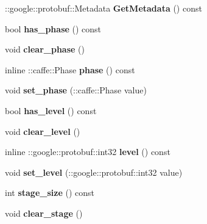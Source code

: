 \begin{DoxyCompactItemize}
\+::google\+::protobuf\+::\+Metadata {\bfseries Get\+Metadata} () const
\item 
\mbox{\label{classcaffe_1_1_net_state_aafd95100cc8ca5ce87c761667bbf393f}} 
bool {\bfseries has\+\_\+phase} () const
\item 
\mbox{\label{classcaffe_1_1_net_state_af50137493381c9651eaecf3464f3e2be}} 
void {\bfseries clear\+\_\+phase} ()
\item 
\mbox{\label{classcaffe_1_1_net_state_a53077555e0e42f88aca0f782a24d9005}} 
inline \+::caffe\+::\+Phase {\bfseries phase} () const
\item 
\mbox{\label{classcaffe_1_1_net_state_adf565a17b80511fcfe893353ce5e9343}} 
void {\bfseries set\+\_\+phase} (\+::caffe\+::\+Phase value)
\item 
\mbox{\label{classcaffe_1_1_net_state_abee34a40c3349b58f21950357f850e9c}} 
bool {\bfseries has\+\_\+level} () const
\item 
\mbox{\label{classcaffe_1_1_net_state_a24e7f1b57c871344c342653f1206e683}} 
void {\bfseries clear\+\_\+level} ()
\item 
\mbox{\label{classcaffe_1_1_net_state_ad68adbd20b3d2be3c31cd8212bb51987}} 
inline \+::google\+::protobuf\+::int32 {\bfseries level} () const
\item 
\mbox{\label{classcaffe_1_1_net_state_a17fdc4f534cfa7478c15ac5c89e14a81}} 
void {\bfseries set\+\_\+level} (\+::google\+::protobuf\+::int32 value)
\item 
\mbox{\label{classcaffe_1_1_net_state_a137a9ce4203326255cf83a38b4a70fec}} 
int {\bfseries stage\+\_\+size} () const
\item 
\mbox{\label{classcaffe_1_1_net_state_ad58c49951dc923008bbc1073f83ec7bb}} 
void {\bfseries clear\+\_\+stage} ()
\item 
\mbox{\label{classcaffe_1_1_net_state_afc10f2b88a46b3066a27eef51750ee7b}} 

\end{DoxyCompactItemize}

